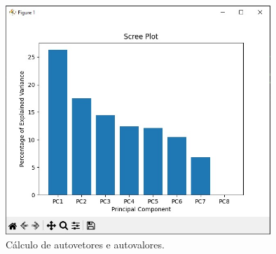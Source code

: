 \documentclass{article}
\begin{document}
\begin{figure}[!h]
\centering
\includegraphics[width=10cm]{pci.jpg}
\caption{Cálculo de autovetores e autovalores.}
\label{fig:pca.jpg}
\end{figure}
\end{document}
